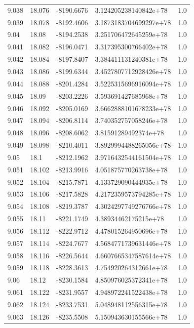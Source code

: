 \begin{tabular}{lllll}
9.038 & 18.076 & -8190.6676 & 3.124205238140842e+78 & 1.0 \\
9.039 & 18.078 & -8192.4606 & 3.1873183704699297e+78 & 1.0 \\
9.04 & 18.08 & -8194.2538 & 3.251706472645259e+78 & 1.0 \\
9.041 & 18.082 & -8196.0471 & 3.317395300766402e+78 & 1.0 \\
9.042 & 18.084 & -8197.8407 & 3.384411131240381e+78 & 1.0 \\
9.043 & 18.086 & -8199.6344 & 3.4527807712928426e+78 & 1.0 \\
9.044 & 18.088 & -8201.4284 & 3.5225315696916094e+78 & 1.0 \\
9.045 & 18.09 & -8203.2226 & 3.593691427685968e+78 & 1.0 \\
9.046 & 18.092 & -8205.0169 & 3.6662888101678233e+78 & 1.0 \\
9.047 & 18.094 & -8206.8114 & 3.740352757058246e+78 & 1.0 \\
9.048 & 18.096 & -8208.6062 & 3.81591289492374e+78 & 1.0 \\
9.049 & 18.098 & -8210.4011 & 3.8929994488265056e+78 & 1.0 \\
9.05 & 18.1 & -8212.1962 & 3.9716432544161504e+78 & 1.0 \\
9.051 & 18.102 & -8213.9916 & 4.051875770263738e+78 & 1.0 \\
9.052 & 18.104 & -8215.7871 & 4.133729090444935e+78 & 1.0 \\
9.053 & 18.106 & -8217.5828 & 4.2172359573794285e+78 & 1.0 \\
9.054 & 18.108 & -8219.3787 & 4.3024297749276766e+78 & 1.0 \\
9.055 & 18.11 & -8221.1749 & 4.38934462175215e+78 & 1.0 \\
9.056 & 18.112 & -8222.9712 & 4.478015264950696e+78 & 1.0 \\
9.057 & 18.114 & -8224.7677 & 4.5684771739631446e+78 & 1.0 \\
9.058 & 18.116 & -8226.5644 & 4.6607665347587614e+78 & 1.0 \\
9.059 & 18.118 & -8228.3613 & 4.754920264312661e+78 & 1.0 \\
9.06 & 18.12 & -8230.1584 & 4.850976025372341e+78 & 1.0 \\
9.061 & 18.122 & -8231.9557 & 4.948972241522438e+78 & 1.0 \\
9.062 & 18.124 & -8233.7531 & 5.048948112556315e+78 & 1.0 \\
9.063 & 18.126 & -8235.5508 & 5.150943630155566e+78 & 1.0 \\

\end{tabular}

